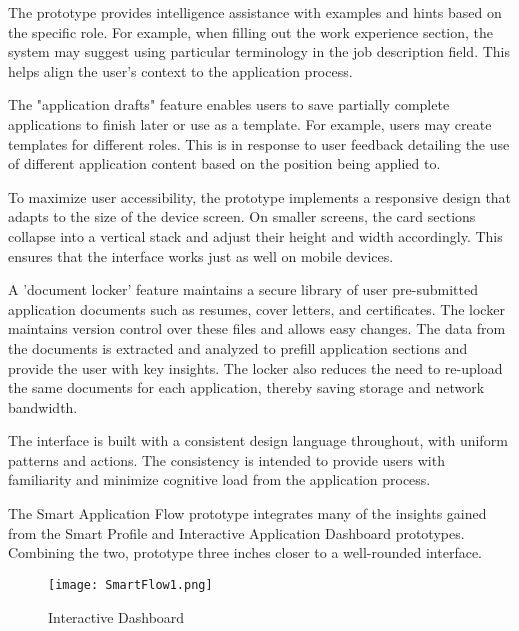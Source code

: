 \documentclass[
	letterpaper, %
]{jdf}
\begin{document}
The prototype provides intelligence assistance with examples and hints based on the specific role. For example, when filling out the work experience section, the system may suggest using particular terminology in the job description field. This helps align the user's context to the application process.

The "application drafts" feature enables users to save partially complete applications to finish later or use as a template. For example, users may create templates for different roles. This is in response to user feedback detailing the use of different application content based on the position being applied to.

To maximize user accessibility, the prototype implements a responsive design that adapts to the size of the device screen. On smaller screens, the card sections collapse into a vertical stack and adjust their height and width accordingly. This ensures that the interface works just as well on mobile devices.

A 'document locker' feature maintains a secure library of user pre-submitted application documents such as resumes, cover letters, and certificates. The locker maintains version control over these files and allows easy changes. The data from the documents is extracted and analyzed to prefill application sections and provide the user with key insights. The locker also reduces the need to re-upload the same documents for each application, thereby saving storage and network bandwidth.

The interface is built with a consistent design language throughout, with uniform patterns and actions. The consistency is intended to provide users with familiarity and minimize cognitive load from the application process.

The Smart Application Flow prototype integrates many of the insights gained from the Smart Profile and Interactive Application Dashboard prototypes. Combining the two, prototype three inches closer to a well-rounded interface. 

\begin{figure}
    \centering
    \texttt{[image: SmartFlow1.png]}
    \caption{Interactive Dashboard}
    \label{fig:enter-label}
\end{figure}
\end{document}
